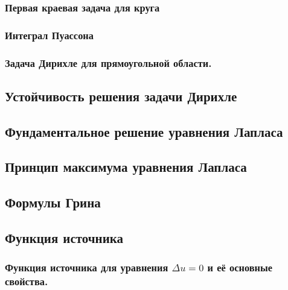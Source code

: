 \documentclass[12pt, a4paper]{article}
\begin{document}
		\subsubsection{Первая краевая задача для круга}
			

		\subsubsection{Интеграл Пуассона}
			\newpage

		\subsubsection{Задача Дирихле для прямоугольной области.}
			 \newpage

	\subsection{Устойчивость решения задачи Дирихле}\label{que:22}
		 \newpage
		
	\subsection{Фундаментальное решение уравнения Лапласа}\label{que:20}
		 \newpage

	\subsection{Принцип максимума уравнения Лапласа}\label{que:21}
		 \newpage
	
	\subsection{Формулы Грина}\label{que:19}
		   \newpage

	\subsection{Функция источника}
			
	
		\subsubsection{Функция источника для уравнения $\Delta u = 0$ и её основные свойства.}
			
\end{document}

